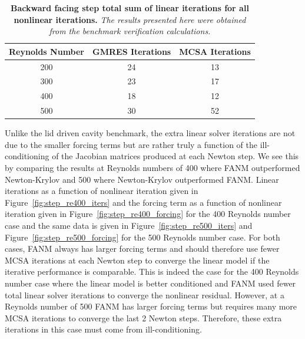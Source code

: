 \begin{table}[h!]
  \begin{center}
    \begin{tabular}{ccc}\hline\hline
      \multicolumn{1}{c}{Reynolds Number}& 
      \multicolumn{1}{c}{GMRES Iterations}&
      \multicolumn{1}{c}{MCSA Iterations}\\
      \hline
      200 & 24 & 13 \\
      300 & 23 & 17 \\
      400 & 18 & 12 \\
      500 & 30 & 52 \\
      \hline\hline
    \end{tabular}
  \end{center}
  \caption{\textbf{Backward facing step total sum of linear
      iterations for all nonlinear iterations.} \textit{The results
      presented here were obtained from the benchmark verification
      calculations.}}
  \label{tab:step_linear_iter_comparison}
\end{table}

Unlike the lid driven cavity benchmark, the extra linear solver
iterations are not due to the smaller forcing terms but are rather
truly a function of the ill-conditioning of the Jacobian matrices
produced at each Newton step. We see this by comparing the results at
Reynolds numbers of 400 where FANM outperformed Newton-Krylov and 500
where Newton-Krylov outperformed FANM. Linear iterations as a function
of nonlinear iteration given in Figure~\ref{fig:step_re400_iters} and
the forcing term as a function of nonlinear iteration given in
Figure~\ref{fig:step_re400_forcing} for the 400 Reynolds number case
and the same data is given in Figure~\ref{fig:step_re500_iters} and
Figure~\ref{fig:step_re500_forcing} for the 500 Reynolds number
case. For both cases, FANM always has larger forcing terms and should
therefore use fewer MCSA iterations at each Newton step to converge
the linear model if the iterative performance is comparable. This is
indeed the case for the 400 Reynolds number case where the linear
model is better conditioned and FANM used fewer total linear solver
iterations to converge the nonlinear residual. However, at a Reynolds
number of 500 FANM has larger forcing terms but requires many more
MCSA iterations to converge the last 2 Newton steps. Therefore, these
extra iterations in this case must come from ill-conditioning.

